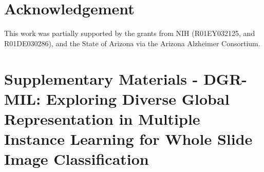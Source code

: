 \documentclass[runningheads]{llncs}
\begin{document}
\section{Acknowledgement} This work was partially supported by the grants from NIH (R01EY032125, and R01DE030286), and the State of Arizona via the Arizona Alzheimer Consortium.



% 

\clearpage 
\appendix


 \clearpage\section*{\Large Supplementary Materials - DGR-MIL: Exploring Diverse Global Representation in Multiple Instance Learning for Whole Slide Image Classification}






\end{document}
